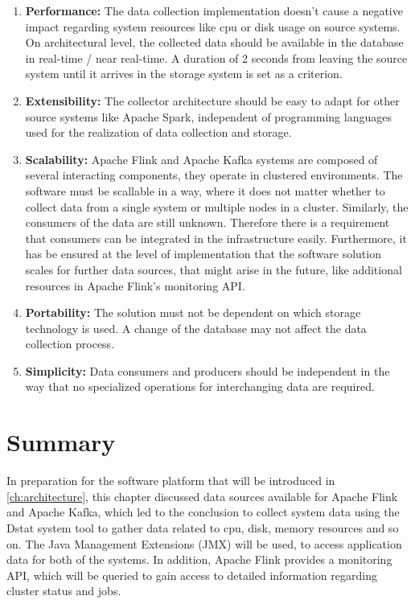 \begin{enumerate}
    \item \textbf{Performance:} The data collection implementation doesn't cause a negative impact regarding
    system resources like cpu or disk usage on source systems. On architectural level, the collected data should be
    available in the database in real-time / near real-time. A duration of 2 seconds from leaving the source system until
    it arrives in the storage system is set as a criterion.

    \item \textbf{Extensibility:} The collector architecture should be easy to adapt for other source systems
    like Apache Spark, independent of programming languages used for the realization of data collection and storage.

    \item \textbf{Scalability:} Apache Flink and Apache Kafka systems are composed of several interacting components, they
    operate in clustered environments. The software must be scallable in a way, where it does not matter whether to collect
    data from a single system or multiple nodes in a cluster. Similarly, the consumers of the data are still unknown. Therefore
    there is a requirement that consumers can be integrated in the infrastructure easily.
    Furthermore, it has be ensured at the level of implementation that the software solution scales for further data sources,
    that might arise in the future, like additional resources in Apache Flink's monitoring API.

    \item \textbf{Portability:} The solution must not be dependent on which storage technology is used. A change of the
    database may not affect the data collection process.

    \item \textbf{Simplicity:} Data consumers and producers should be independent in the way that no specialized operations
    for interchanging data are required.
\end{enumerate}

\section{Summary}

In preparation for the software platform that will be introduced in \autoref{ch:architecture}, this chapter discussed
data sources available for Apache Flink and Apache Kafka, which led to the conclusion to collect system data using the Dstat
system tool to gather data related to cpu, disk, memory resources and so on. The Java Management Extensions (JMX) will be used,
to access application data for both of the systems. In addition, Apache Flink provides a monitoring API, which will be
queried to gain access to detailed information regarding cluster status and jobs.

